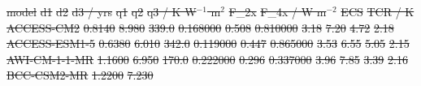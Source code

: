 \documentclass[gmd, manuscript]{copernicus}
\providecommand{\DIFadd}[1]{{\protect\color{blue}#1}} %
\providecommand{\DIFdel}[1]{{\protect\color{red}\sout{#1}}}                      %
\providecommand{\DIFaddbegin}{} %
\providecommand{\DIFdelend}{} %
\providecommand{\DIFaddFL}[1]{\DIFadd{#1}} %
\providecommand{\DIFdelFL}[1]{\DIFdel{#1}} %
\providecommand{\DIFaddendFL}{} %
\providecommand{\DIFdelbeginFL}{} %
\begin{document}
\DIFdelend \DIFaddbegin \clearpage
\begin{table}[t]
    \caption{\DIFaddFL{Tuned CMIP6 thermal response parameters.}}
    \label{table:resp_p}
    \DIFaddendFL {\DIFdelbeginFL \DIFdelFL{model}%
\DIFdelFL{d1 }%
\DIFdelFL{d2  }%
\DIFdelFL{d3 / yrs }%
\DIFdelFL{q1 }%
\DIFdelFL{q2 }%
\DIFdelFL{q3 / K W$^{-1}$ m$^{2}$}%
\DIFdelFL{F\_2x }%
\DIFdelFL{F\_4x / W m$^{-2}$ }%
\DIFdelFL{ECS }%
\DIFdelFL{TCR / K }%
\DIFdelFL{ACCESS-CM2      }%
\DIFdelFL{0.8140 }%
\DIFdelFL{8.980 }%
\DIFdelFL{339.0 }%
\DIFdelFL{0.168000 }%
\DIFdelFL{0.508 }%
\DIFdelFL{0.810000 }%
\DIFdelFL{3.18 }%
\DIFdelFL{7.20 }%
\DIFdelFL{4.72 }%
\DIFdelFL{2.18 }%
\DIFdelFL{ACCESS-ESM1-5   }%
\DIFdelFL{0.6380 }%
\DIFdelFL{6.010 }%
\DIFdelFL{342.0 }%
\DIFdelFL{0.119000 }%
\DIFdelFL{0.447 }%
\DIFdelFL{0.865000 }%
\DIFdelFL{3.53 }%
\DIFdelFL{6.55 }%
\DIFdelFL{5.05 }%
\DIFdelFL{2.15 }%
\DIFdelFL{AWI-CM-1-1-MR   }%
\DIFdelFL{1.1600 }%
\DIFdelFL{6.950 }%
\DIFdelFL{170.0 }%
\DIFdelFL{0.222000 }%
\DIFdelFL{0.296 }%
\DIFdelFL{0.337000 }%
\DIFdelFL{3.96 }%
\DIFdelFL{7.85 }%
\DIFdelFL{3.39 }%
\DIFdelFL{2.16 }%
\DIFdelFL{BCC-CSM2-MR     }%
\DIFdelFL{1.2200 }%
\DIFdelFL{7.230 }%
}
\end{table}
\end{document}
